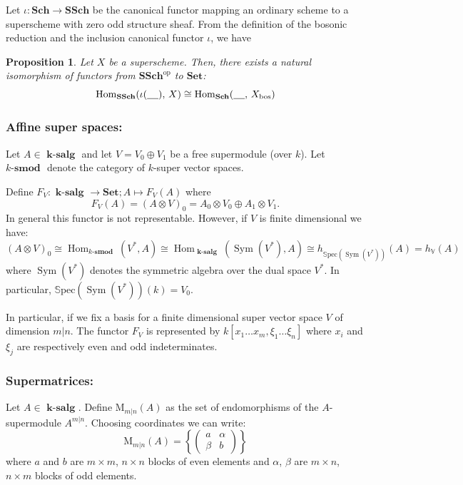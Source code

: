 \documentclass[12pt, reqno]{amsart}
\theoremstyle{plain}
\newtheorem{proposition}[theorem]{Proposition}
\numberwithin{equation}{section}
\def \ra{\rightarrow}
\newcommand{\Hom}{\operatorname{Hom}\nolimits}
\newcommand{\Sym}{\operatorname{Sym}\nolimits}
\newcommand{\salg} {\textbf{ k-salg }}
\newcommand{\smod} {k\text{-}\textbf{smod }}
\newcommand{\rM}{\mathrm{M}}
\newcommand{\Spec}[1]{\mathbb{S}\mathrm{pec}(#1)}
\newcommand{\SSch}{\mathbf{SSch}}
\newcommand{\Sch}{\mathbf{Sch}}
\newcommand{\Set}{\mathbf{Set}}
\begin{document}
Let $\iota \colon \Sch \ra \SSch$ be the canonical functor mapping an ordinary scheme to a superscheme with zero odd structure sheaf. From the definition of the bosonic reduction and the inclusion canonical functor $\iota$, we have

\begin{proposition}\label{prop-bosonic-reduction}
Let $X$ be a superscheme. Then, there exists a natural isomorphism of functors from $\SSch^\text{op}$ to $\Set$:
$$
\Hom_{\SSch}(\iota(\underline{\hspace{0.4cm}}),\, X) \cong
\Hom_{\Sch}(\underline{\hspace{0.4cm}},\, X_\mathrm{bos})
$$
\end{proposition}


\subsubsection{Affine super spaces: }
Let $A \in \salg$ and let $V=V_0 \oplus V_1$ be a
free supermodule (over $k$). Let $\smod$ denote
the category of $k$-super vector spaces.

Define $F_V: \salg \to \mathbf{Set}; A \mapsto F_V(A)$ where 
$$
F_V(A) = (A \otimes V)_0 = A_0 \otimes V_0 \oplus A_1 \otimes V_1.
$$
In general this functor is not representable. However, if $V$ is finite
dimensional we have:
$$
(A \otimes V)_0 \cong 
\Hom_{\smod}(V^*,A) \cong \Hom_{\salg}(\Sym(V^*),A) \cong 
h_{\Spec{\Sym(V^*)}}(A) = h_{\mathbb V}(A)
$$
where $\Sym(V^*)$ denotes the symmetric algebra over the dual space $V^*$.
In particular, $\Spec{\Sym(V^*)}(k) = V_0$.

In particular, if we fix a basis for a finite dimensional super vector space $V$ of dimension $m|n$.
The functor $F_V$ is represented by 
$k[x_1 \dots x_m, \xi_1 \dots \xi_n]$
where $x_i$ and $\xi_j$ are respectively even and odd indeterminates.

\subsubsection{Supermatrices: }
Let $A \in \salg$.
Define $\rM_{m|n}(A)$ as the set of endomorphisms of the $A$-supermodule
$A^{m|n}$. Choosing coordinates we can write:
$$
\rM_{m|n}(A)=
\left\{ \begin{pmatrix} a & \alpha \\ \beta & b \end{pmatrix} 
\right\}
$$
where $a$ and $b$ are $m \times m$, $n \times n$ blocks of even elements
and $\alpha$, $\beta$ are $m\times n$, $n \times m$ blocks of odd elements.
\end{document}
